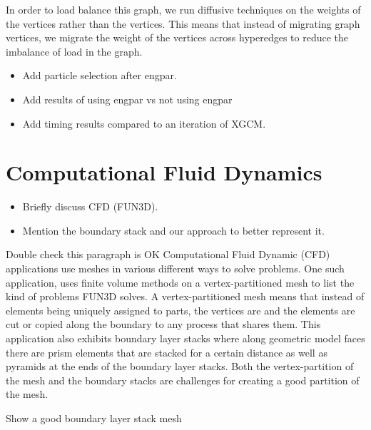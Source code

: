 \documentclass[conference]{IEEEtran}
\begin{document}
In order to load balance this graph, we run diffusive techniques on the weights of the vertices
rather than the vertices. This means that instead of migrating graph vertices, we migrate the
weight of the vertices across hyperedges to reduce the imbalance of load in the graph.

\begin{itemize}
\item Add particle selection after engpar.
\item Add results of using engpar vs not using engpar
\item Add timing results compared to an iteration of XGCM.
\end{itemize}

\section{Computational Fluid Dynamics}

\begin{itemize}
\item Briefly discuss CFD (FUN3D).
\item Mention the boundary stack and our approach to better represent it.
\end{itemize}

{\color{red} Double check this paragraph is OK}
Computational Fluid Dynamic (CFD) applications use meshes in various different ways to solve
problems. One such application, uses finite volume methods on a vertex-partitioned mesh to
{\color{red} list the kind of problems FUN3D solves}. A vertex-partitioned mesh means that
instead of elements being uniquely assigned to parts, the vertices are and the elements are
cut or copied along the boundary to any process that shares them. This application also exhibits
boundary layer stacks where along geometric model faces there are prism elements that are stacked
for a certain distance as well as pyramids at the ends of the boundary layer stacks. Both the
vertex-partition of the mesh and the boundary stacks are challenges for creating a good partition
of the mesh.

{\color{red} Show a good boundary layer stack mesh}
\end{document}
